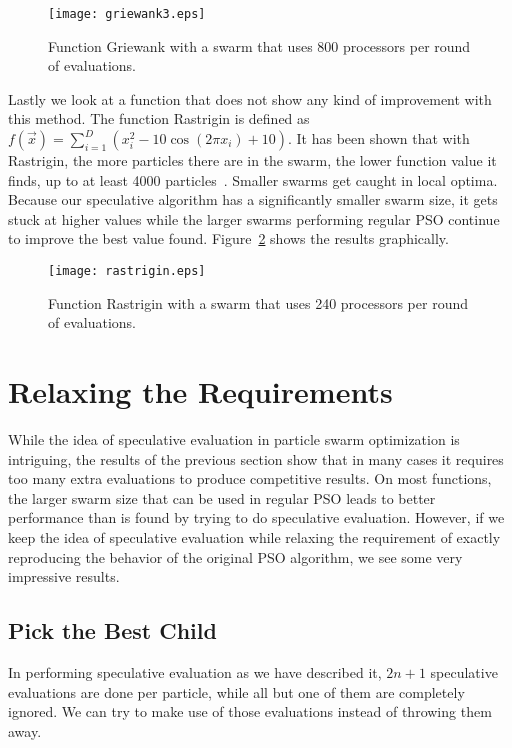 \documentclass[journal,letterpaper]{IEEEtran}
\newcommand{\fig}[1]{Figure~\ref{fig:#1}}
\begin{document}
\begin{figure}
  \centering
  \texttt{[image: griewank3.eps]}
  \caption{Function Griewank with a swarm that uses 800 processors per round of
  evaluations.}
  \label{fig:basic-griewank3}
\end{figure}

Lastly we look at a function that does not show any kind of improvement with
this method.  The function Rastrigin is defined as $f(\Vec{x}) = \sum_{i=1}^D
\left(x_i^2 - 10\cos\left(2\pi x_i\right) + 10\right)$.  It has been shown that
with Rastrigin, the more particles there are in the swarm, the lower function
value it finds, up to at least 4000 particles~\cite{mcnabb-cec09}.  Smaller
swarms get caught in local optima.  Because our speculative algorithm has a
significantly smaller swarm size, it gets stuck at higher values while the
larger swarms performing regular PSO continue to improve the best value found.
\fig{rastrigin} shows the results graphically.

\begin{figure}
  \centering
  \texttt{[image: rastrigin.eps]}
  \caption{Function Rastrigin with a swarm that uses 240 processors per round
  of evaluations.}
  \label{fig:rastrigin}
\end{figure}

\section{Relaxing the Requirements}
\label{sec:relax}

While the idea of speculative evaluation in particle swarm optimization is
intriguing, the results of the previous section show that in many cases it
requires too many extra evaluations to produce competitive results.  On most
functions, the larger swarm size that can be used in regular PSO leads to
better performance than is found by trying to do speculative evaluation.
However, if we keep the idea of speculative evaluation while relaxing the
requirement of exactly reproducing the behavior of the original PSO algorithm,
we see some very impressive results.

\subsection{Pick the Best Child}
\label{sec:pickbest}

In performing speculative evaluation as we have described it, $2n+1$
speculative evaluations are done per particle, while all but one of them are
completely ignored.  We can try to make use of those evaluations instead of
throwing them away.  
\end{document}
